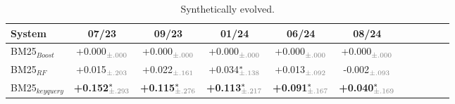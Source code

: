 \begin{table}[t]
\small
\centering
\renewcommand{\tabcolsep}{2.8pt}
\caption{Synthetically evolved.}
\label{tab:table-results-fold}

\begin{tabular}{@{}lcccccccccc@{}}
    \toprule
    \bfseries System & \bfseries 07/23 & \bfseries 09/23 & \bfseries 01/24 & \bfseries 06/24 & \bfseries 08/24 \\
    
    \midrule

    
    BM25$_{Boost}$ & +0.000$^{\phantom{*}}_{\color{gray}\pm.000}$ & +0.000$^{\phantom{*}}_{\color{gray}\pm.000}$ & +0.000$^{\phantom{*}}_{\color{gray}\pm.000}$ & +0.000$^{\phantom{*}}_{\color{gray}\pm.000}$ & +0.000$^{\phantom{*}}_{\color{gray}\pm.000}$ \\
    BM25$_{RF}$ & +0.015$^{\phantom{*}}_{\color{gray}\pm.203}$ & +0.022$^{\phantom{*}}_{\color{gray}\pm.161}$ & +0.034$^{*}_{\color{gray}\pm.138}$ & +0.013$^{\phantom{*}}_{\color{gray}\pm.092}$ & -0.002$^{\phantom{*}}_{\color{gray}\pm.093}$ \\
    BM25$_{keyquery}$ & \bfseries +0.152$^{*}_{\color{gray}\pm.293}$ & \bfseries  +0.115$^{*}_{\color{gray}\pm.276}$ & \bfseries  +0.113$^{*}_{\color{gray}\pm.217}$ & \bfseries  +0.091$^{*}_{\color{gray}\pm.167}$ & \bfseries +0.040$^{*}_{\color{gray}\pm.169}$ \\

\bottomrule
\end{tabular}
\end{table}
